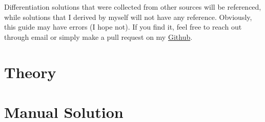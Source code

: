 \documentclass{article}
\begin{document}
Differentiation solutions that were collected from other sources will be referenced, while solutions that I derived by myself will not have any reference. Obviously, this guide may have errors (I hope not). If you find it, feel free to reach out through email or simply make a pull request on my \href{https://github.com/tapyu/tapyu.github.io/tree/master/notes/posts/matrix_diff_ref/latex}{Github}.

\part{Theory}





\part{Manual Solution}


\end{document}
